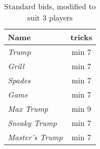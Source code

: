 %
%
%

\begin{table}
	\caption{Standard bids, modified to suit $3$ players}\label{tab:standardBids3}
	\begin{center}
		\begin{tabular}{l|c}
			\textbf{Name} & \textbf{tricks}
			\\ \hline
			\textit{Trump} & min 7 \\
			\textit{Grill} & min 7 \\
			\textit{Spades} & min 7 \\
			\textit{Game} & min 7 \\
			\textit{Max Trump} & min 9 \\
			\textit{Sneaky Trump} & min 7 \\
			\textit{Master's Trump} & min 7
		\end{tabular}
	\end{center}
\end{table}
